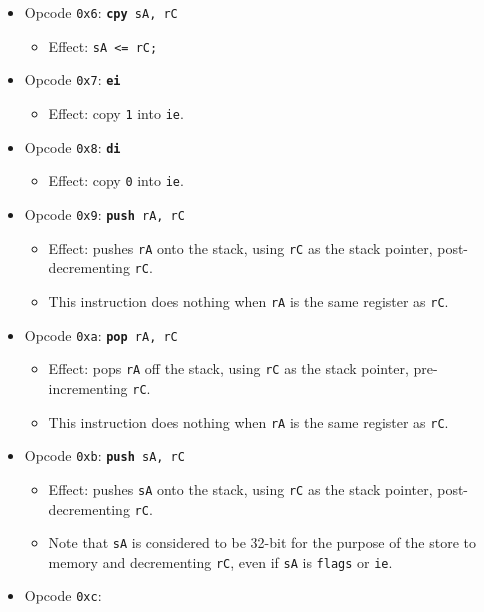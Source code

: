 \documentclass{article}
\begin{document}
\begin{itemize}
\begin{itemize}
		\end{itemize}
		\item Opcode \texttt{0x6}:
			\texttt{\textbf{cpy} sA, rC}
		\begin{itemize}
			\item Effect: \texttt{sA <= rC;}
		\end{itemize}
		\item Opcode \texttt{0x7}:
			\texttt{\textbf{ei}}
		\begin{itemize}
			\item Effect: copy \texttt{1} into \texttt{ie}.
		\end{itemize}
		\item Opcode \texttt{0x8}:
			\texttt{\textbf{di}}
		\begin{itemize}
			\item Effect: copy \texttt{0} into \texttt{ie}.
		\end{itemize}
		\item Opcode \texttt{0x9}:
			\texttt{\textbf{push} rA, rC}
		\begin{itemize}
			\item Effect: pushes \texttt{rA} onto the stack, using
			\texttt{rC} as the stack pointer, post-decrementing
			\texttt{rC}.
			\item This instruction does nothing when \texttt{rA} is the
			same register as \texttt{rC}. 
		\end{itemize}
		\item Opcode \texttt{0xa}:
			\texttt{\textbf{pop} rA, rC}
		\begin{itemize}
			\item Effect: pops \texttt{rA} off the stack, using
			\texttt{rC} as the stack pointer, pre-incrementing \texttt{rC}.
			\item This instruction does nothing when \texttt{rA} is the
			same register as \texttt{rC}. 
		\end{itemize}
		\item Opcode \texttt{0xb}:
			\texttt{\textbf{push} sA, rC}
		\begin{itemize}
			\item Effect: pushes \texttt{sA} onto the stack, using
			\texttt{rC} as the stack pointer, post-decrementing
			\texttt{rC}.
			\item Note that \texttt{sA} is considered to be 32-bit for the
			purpose of the store to memory and decrementing \texttt{rC},
			even if \texttt{sA} is \texttt{flags} or \texttt{ie}.
		\end{itemize}
		\item Opcode \texttt{0xc}:

\end{itemize}
\end{document}
